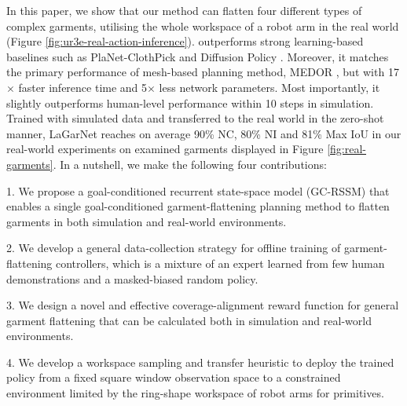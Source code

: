 \documentclass[journal]{IEEEtran}
\begin{document}

In this paper, we show that our method  can flatten four different types of complex garments, utilising the whole workspace of a robot arm in the real world (Figure \ref{fig:ur3e-real-action-inference}).  outperforms strong learning-based baselines such as PlaNet-ClothPick \cite{kadi2024planet} and Diffusion Policy \cite{chi2023diffusionpolicy}.  Moreover, it  matches the primary performance of mesh-based planning method, MEDOR \cite{huang2022mesh}, but with 17$\times$ faster inference time and 5$\times$ less network parameters. Most importantly, it slightly outperforms human-level performance within 10 steps in simulation. Trained with simulated data and transferred to the real world in the zero-shot manner, LaGarNet reaches on average 90\% NC, 80\% NI and 81\% Max IoU in our real-world experiments on examined garments displayed in Figure \ref{fig:real-garments}. In a nutshell, we make the following four contributions:

1. We propose a goal-conditioned recurrent state-space model (GC-RSSM) that enables a single goal-conditioned garment-flattening planning method  to flatten garments in both simulation and real-world environments.

2. We develop a general data-collection strategy for offline training of  garment-flattening controllers, which is a mixture of an expert  learned from few human demonstrations and a masked-biased random policy.

3. We design a novel and effective coverage-alignment reward function for general garment flattening that can be calculated both in simulation and real-world environments.

4. We develop a workspace sampling and transfer heuristic to deploy the trained policy from a fixed square window observation space to a constrained environment limited by the  ring-shape workspace of robot arms for  primitives.

\end{document}
